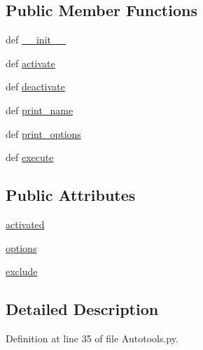 \subsection*{Public Member Functions}
\begin{DoxyCompactItemize}
\item 
def \hyperlink{classAutotools_1_1Autotools_a5b5ac092ad7f4bc45bf785633c8be95a}{\-\_\-\-\_\-init\-\_\-\-\_\-}
\item 
def \hyperlink{classAutotools_1_1Autotools_a202b0e727db575d20a381cd039dd3597}{activate}
\item 
def \hyperlink{classAutotools_1_1Autotools_a74513a2f4135b506e66c047559f9571e}{deactivate}
\item 
def \hyperlink{classAutotools_1_1Autotools_a0873459245ef2255a5a7386957fa592e}{print\-\_\-name}
\item 
def \hyperlink{classAutotools_1_1Autotools_a41481e9f2a7e7fce32f51cc8feb909fd}{print\-\_\-options}
\item 
def \hyperlink{classAutotools_1_1Autotools_a5ae85e70e9e6252f4be23ef60624f633}{execute}
\end{DoxyCompactItemize}
\subsection*{Public Attributes}
\begin{DoxyCompactItemize}
\item 
\hyperlink{classAutotools_1_1Autotools_a6bbb714a91bc8b6fe749326772b073b3}{activated}
\item 
\hyperlink{classAutotools_1_1Autotools_a8b348e19f0a7104bde9c43c3a6ed695d}{options}
\item 
\hyperlink{classAutotools_1_1Autotools_aee37d9789ea22ee310ebc357cd721b7f}{exclude}
\end{DoxyCompactItemize}


\subsection{Detailed Description}


Definition at line 35 of file Autotools.\-py.



